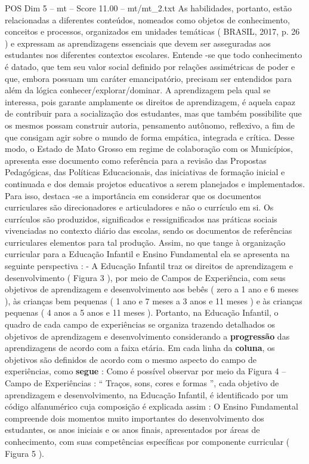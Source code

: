 \begin{textsample}{POS Dim 5 – mt – Score 11.00 – mt/mt\_2.txt}
As habilidades, portanto, estão relacionadas a diferentes conteúdos, nomeados como objetos de conhecimento, conceitos e processos, organizados em unidades temáticas ( BRASIL, 2017, p. 26 ) e expressam as aprendizagens essenciais que devem ser asseguradas aos estudantes nos diferentes contextos escolares.
Entende -se que todo conhecimento é datado, que tem seu valor social definido por relações assimétricas de poder e que, embora possuam um caráter emancipatório, precisam ser entendidos para além da lógica conhecer/explorar/dominar.
A aprendizagem pela qual se interessa, pois garante amplamente os direitos de aprendizagem, é aquela capaz de contribuir para a socialização dos estudantes, mas que também possibilite que os mesmos possam construir autoria, pensamento autônomo, reflexivo, a fim de que consigam agir sobre o mundo de forma empática, integrada e crítica.
Desse modo, o Estado de Mato Grosso em regime de colaboração com os Municípios, apresenta esse documento como referência para a revisão das Propostas Pedagógicas, das Políticas Educacionais, das iniciativas de formação inicial e continuada e dos demais projetos educativos a serem planejados e implementados.
Para isso, destaca -se a importância em considerar que os documentos curriculares são direcionadores e articuladores e não o currículo em si.
Os currículos são produzidos, significados e ressignificados nas práticas sociais vivenciadas no contexto diário das escolas, sendo os documentos de referências curriculares elementos para tal produção.
Assim, no que tange à organização curricular para a Educação Infantil e Ensino Fundamental ela se apresenta na seguinte perspectiva : - A Educação Infantil traz os direitos de aprendizagem e desenvolvimento ( Figura 3 ), por meio de Campos de Experiência, com seus objetivos de aprendizagem e desenvolvimento aos bebês ( zero a 1 ano e 6 meses ), às crianças bem pequenas ( 1 ano e 7 meses a 3 anos e 11 meses ) e às crianças pequenas ( 4 anos a 5 anos e 11 meses ).
Portanto, na Educação Infantil, o quadro de cada campo de experiências se organiza trazendo detalhados os objetivos de aprendizagem e desenvolvimento considerando a \textbf{progressão} das aprendizagens de acordo com a faixa etária.
Em cada linha da \textbf{coluna}, os objetivos são definidos de acordo com o mesmo aspecto do campo de experiências, como \textbf{segue} : Como é possível observar por meio da Figura 4 – Campo de Experiências : “ Traços, sons, cores e formas ”, cada objetivo de aprendizagem e desenvolvimento, na Educação Infantil, é identificado por um código alfanumérico cuja composição é explicada assim : O Ensino Fundamental compreende dois momentos muito importantes do desenvolvimento dos estudantes, os anos iniciais e os anos finais, apresentados por áreas de conhecimento, com suas competências específicas por componente curricular ( Figura 5 ).

\end{textsample}
